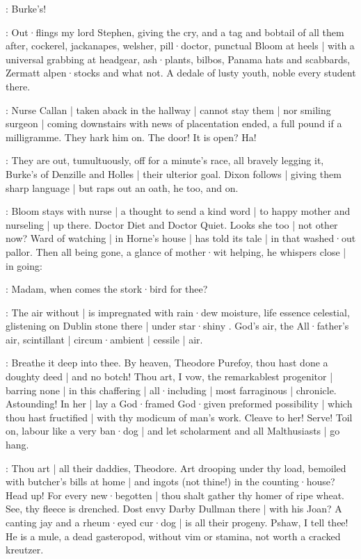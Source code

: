 

\stephen:
Burke's!

:
Out·flings my lord Stephen,
giving the cry,
and a tag and bobtail
of all them after,
cockerel,
jackanapes,
welsher,
pill·doctor,
punctual Bloom at heels |
with a universal grabbing at headgear,
ash·plants,
bilbos,
Panama hats and scabbards,
Zermatt alpen·stocks and what not.
A dedale of lusty youth,
noble every student there.

:
Nurse Callan |
taken aback in the hallway |
cannot stay them |
nor smiling surgeon |
coming downstairs with news of placentation ended,
a full pound if a milligramme.
They hark him on.
The door!
It is open?
Ha!

:
They are out,
tumultuously,
off for a minute's race,
all bravely legging it,
Burke's of Denzille and Holles |
their ulterior goal.
Dixon follows |
giving them sharp language |
but raps out an oath,
he too,
and on.


:
Bloom stays with nurse |
a thought to send a kind word |
to happy mother and nurseling |
up there.
Doctor Diet and Doctor Quiet.
Looks she too |
not other now?
Ward of watching |
in Horne's house |
has told its tale |
in that washed·out pallor.
Then all being gone,
a glance of mother·wit helping,
he whispers close |
in going:

\Bloom:
Madam,
when comes the stork·bird for thee?

:
The air without |
is impregnated with rain·dew moisture,
life essence celestial,
glistening on Dublin stone there |
under star·shiny .
God's air,
the All·father's air,
scintillant |
circum·ambient |
cessile |
air.

:
Breathe it deep into thee.
By heaven,
Theodore Purefoy,
thou hast done a doughty deed |
and no botch!
Thou art,
I vow,
the remarkablest progenitor |
barring none |
in this chaffering |
all·including |
most farraginous |
chronicle.
Astounding!
In her |
lay a God·framed God·given preformed possibility |
which thou hast fructified |
with thy modicum of man's work.
Cleave to her!
Serve!
Toil on,
labour like a very ban·dog |
and let scholarment and all Malthusiasts |
go hang.

:
Thou art |
all their daddies,
Theodore.
Art drooping under thy load,
bemoiled with butcher's bills at home |
and ingots
(not thine!)
in the counting·house?
Head up!
For every new·begotten |
thou shalt gather thy homer of ripe wheat.
See,
thy fleece is drenched.
Dost envy Darby Dullman there |
with his Joan?
A canting jay and a rheum·eyed cur·dog |
is all their progeny.
Pshaw,
I tell thee!
He is a mule,
a dead gasteropod,
without vim or stamina,
not worth a cracked kreutzer.

